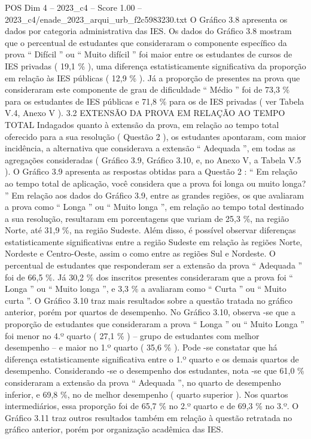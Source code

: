 \begin{textsample}{POS Dim 4 – 2023\_c4 – Score 1.00 – 2023\_c4/enade\_2023\_arqui\_urb\_f2c5983230.txt}
O Gráfico 3.8 apresenta os dados por categoria administrativa das IES.
Os dados do Gráfico 3.8 mostram que o percentual de estudantes que consideraram o componente específico da prova “ Difícil ” ou “ Muito difícil ” foi maior entre os estudantes de cursos de IES privadas ( 19,1 \% ), uma diferença estatisticamente significativa da proporção em relação às IES públicas ( 12,9 \% ).
Já a proporção de presentes na prova que consideraram este componente de grau de dificuldade “ Médio ” foi de 73,3 \% para os estudantes de IES públicas e 71,8 \% para os de IES privadas ( ver Tabela V.4, Anexo V ). 3.2 EXTENSÃO DA PROVA EM RELAÇÃO AO TEMPO TOTAL Indagados quanto à extensão da prova, em relação ao tempo total oferecido para a sua resolução ( Questão 2 ), os estudantes apontaram, com maior incidência, a alternativa que considerava a extensão “ Adequada ”, em todas as agregações consideradas ( Gráfico 3.9, Gráfico 3.10, e, no Anexo V, a Tabela V.5 ).
O Gráfico 3.9 apresenta as respostas obtidas para a Questão 2 : “ Em relação ao tempo total de aplicação, você considera que a prova foi longa ou muito longa? ” Em relação aos dados do Gráfico 3.9, entre as grandes regiões, os que avaliaram a prova como “ Longa ” ou “ Muito longa ”, em relação ao tempo total destinado a sua resolução, resultaram em porcentagens que variam de 25,3 \%, na região Norte, até 31,9 \%, na região Sudeste.
Além disso, é possível observar diferenças estatisticamente significativas entre a região Sudeste em relação às regiões Norte, Nordeste e Centro-Oeste, assim o como entre as regiões Sul e Nordeste.
O percentual de estudantes que responderam ser a extensão da prova “ Adequada ” foi de 66,5 \%.
Já 30,2 \% dos inscritos presentes consideraram que a prova foi “ Longa ” ou “ Muito longa ”, e 3,3 \% a avaliaram como “ Curta ” ou “ Muito curta ”.
O Gráfico 3.10 traz mais resultados sobre a questão tratada no gráfico anterior, porém por quartos de desempenho.
No Gráfico 3.10, observa -se que a proporção de estudantes que consideraram a prova “ Longa ” ou “ Muito Longa ” foi menor no 4.º quarto ( 27,1 \% ) – grupo de estudantes com melhor desempenho – e maior no 1.º quarto ( 35,6 \% ).
Pode -se constatar que há diferença estatisticamente significativa entre o 1.º quarto e os demais quartos de desempenho.
Considerando -se o desempenho dos estudantes, nota -se que 61,0 \% consideraram a extensão da prova “ Adequada ”, no quarto de desempenho inferior, e 69,8 \%, no de melhor desempenho ( quarto superior ).
Nos quartos intermediários, essa proporção foi de 65,7 \% no 2.º quarto e de 69,3 \% no 3.º.
O Gráfico 3.11 traz outros resultados também em relação à questão retratada no gráfico anterior, porém por organização acadêmica das IES.

\end{textsample}
